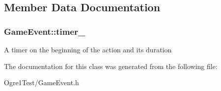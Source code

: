 \subsection{Member Data Documentation}
\subsubsection[{\texorpdfstring{timer\+\_\+}{timer_}}]{ Game\+Event\+::timer\+\_\+\hspace{0.3cm}{\ttfamily [protected]}}\hypertarget{class_game_event_aeda42e09992a2699a8df14bac49c2a12}{}\label{class_game_event_aeda42e09992a2699a8df14bac49c2a12}
A timer on the beginning of the action and its duration 

The documentation for this class was generated from the following file\+:\begin{DoxyCompactItemize}
\item 
Ogre1\+Test/Game\+Event.\+h\end{DoxyCompactItemize}
